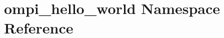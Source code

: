 \hypertarget{namespaceompi__hello__world}{\section{ompi\-\_\-hello\-\_\-world Namespace Reference}
\label{namespaceompi__hello__world}
}
